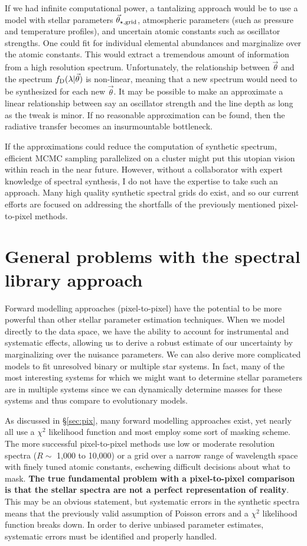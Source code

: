 \documentclass[preprint]{aastex} %
\newcommand{\vt}{\vec{\theta}}
\newcommand{\vg}{\vt_{\star, {\rm grid}}}
\newcommand{\fD}{f_{\rm D}}
\begin{document}
If we had infinite computational power, a tantalizing approach would be to use a model with stellar parameters $\vg$, atmospheric parameters (such as pressure and temperature profiles), and uncertain atomic constants such as oscillator strengths. One could fit for individual elemental abundances and marginalize over the atomic constants. This would extract a tremendous amount of information from a high resolution spectrum. Unfortunately, the relationship between $\vt$ and the spectrum $\fD(\lambda | \vt)$ is non-linear, meaning that a new spectrum would need to be synthesized for each new $\vt$. It may be possible to make an approximate a linear relationship between say an oscillator strength and the line depth as long as the tweak is minor. If no reasonable approximation can be found, then the radiative transfer becomes an insurmountable bottleneck.

If the approximations could reduce the computation of synthetic spectrum, efficient MCMC sampling parallelized on a cluster might put this utopian vision within reach in the near future. However, without a collaborator with expert knowledge of spectral synthesis, I do not have the expertise to take such an approach. Many high quality synthetic spectral grids do exist, and so our current efforts are focused on addressing the shortfalls of the previously mentioned pixel-to-pixel methods.

\section{General problems with the spectral library approach}

Forward modelling approaches (pixel-to-pixel) have the potential to be more powerful than other stellar parameter estimation techniques. When we model directly to the data space, we have the ability to account for instrumental and systematic effects, allowing us to derive a robust estimate of our uncertainty by marginalizing over the nuisance parameters. We can also derive more complicated models to fit unresolved binary or multiple star systems. In fact, many of the most interesting systems for which we might want to determine stellar parameters are in multiple systems since we can dynamically determine masses for these systems and thus compare to evolutionary models.  

As discussed in \S\ref{sec:pix}, many forward modelling approaches exist, yet nearly all use a $\chi^2$ likelihood function and most employ some sort of masking scheme. The more successful pixel-to-pixel methods use low or moderate resolution spectra ($R \sim$ 1,000 to 10,000) or a grid over a narrow range of wavelength space with finely tuned atomic constants, eschewing difficult decisions about what to mask. \textbf{The true fundamental problem with a pixel-to-pixel comparison is that the stellar spectra are not a perfect representation of reality}. This may be an obvious statement, but systematic errors in the synthetic spectra means that the previously valid assumption of Poisson errors and a $\chi^2$ likelihood function breaks down. In order to derive unbiased parameter estimates, systematic errors must be identified and properly handled. 
\end{document}

